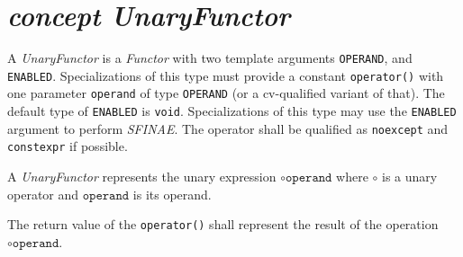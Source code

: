 \section{\textit{concept UnaryFunctor}}
A \textit{UnaryFunctor} is a \textit{Functor} with two template arguments
\verb+OPERAND+,
and
\verb+ENABLED+.
Specializations of this type must provide a constant \verb+operator()+ with one parameter
\verb+operand+ of type \verb+OPERAND+ (or a cv-qualified variant of that). The    default
type of \verb+ENABLED+ is \verb+void+. Specializations of this type may use           the
\verb+ENABLED+ argument to perform \textit{SFINAE}. The operator shall be    qualified as
\texttt{noexcept} and \texttt{constexpr} if possible.\newline

\noindent{}A \textit{UnaryFunctor} represents the unary expression $\circ\texttt{operand}$
where $\circ$ is a unary operator and        $\texttt{operand}$ is its operand.\newline

\noindent{}The return value of the \verb+operator()+ shall represent the result of     the
operation $\circ\texttt{operand}$.

